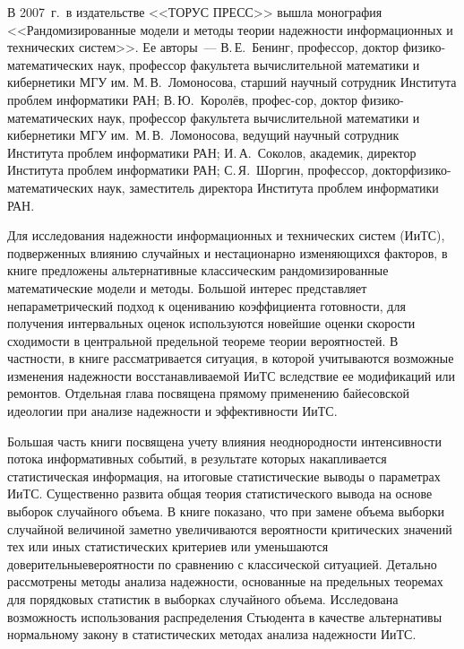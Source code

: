 \def\auf{\ }



\def\leftkol{РЕЦЕНЗИИ}

\def\rightkol{РЕЦЕНЗИИ}

\titele{\tit}{\aut}{\auf}{\leftkol}{\rightkol}

\begin{multicols}{2}

 {\small

     В 2007~г.\ в издательстве <<ТОРУС ПРЕСС>> вышла монография <<Рандомизированные
модели и методы тео\-рии надежности информационных и технических сис\-тем>>. Ее авторы~---
В.\,Е.~Бенинг, профессор, доктор физико-математических наук, профессор факультета
вычислительной математики и кибернетики МГУ им. М.\,В.~Ломоносова, старший научный
сотрудник Института проблем информатики РАН; В.\,Ю.~Королёв, профес-\linebreak сор, доктор
     физико-математических наук, профессор факультета вычислительной математики и
кибернетики МГУ им.\ М.\,В.~Ломоносова, ведущий научный сотрудник Института проблем
информатики РАН; И.\,А.~Со\-колов, академик, директор Института проблем ин\-форматики
РАН; С.\,Я.~Шоргин, профессор, доктор\linebreak физико-математических наук, заместитель директора
Института проблем информатики РАН.

     Для исследования надежности информационных и технических систем (ИиТС),
подверженных влиянию случайных и нестационарно изменяющихся факторов, в книге
предложены альтернативные классическим рандомизированные математические модели и
методы. Большой интерес представляет непараметрический подход к оцениванию
коэффициента готовности, для получения интервальных оценок используются новейшие
оценки скорости сходимости в центральной предельной теореме теории вероятностей. В
частности, в книге рассматривается ситуация, в которой учитываются возможные изменения
надежности восстанавливаемой ИиТС вследствие ее модификаций или ремонтов. Отдельная
глава посвящена прямому применению байесовской идеологии при анализе надежности и
эффективности ИиТС.

     Большая часть книги посвящена учету влияния не\-однородности интенсивности потока
информативных событий, в результате которых накапливается статистическая информация, на
итоговые статистические выводы о параметрах ИиТС. Существенно развита  общая теория
статистического вывода на основе выборок случайного объема. В книге показано, что при
замене объема выборки случайной величиной заметно увеличиваются вероятности
критических значений тех или иных статистических критериев или уменьшаются
доверительные\linebreak вероятности по сравнению с классической ситуацией. Детально рассмотрены
методы анализа на\-деж\-ности, основанные на предельных теоремах для порядковых статистик в
выборках случайного объема. Исследована возможность использования распределения
Стьюдента в качестве альтернативы нормальному закону в статистических методах анализа
надежности ИиТС.

}
\end{multicols}
